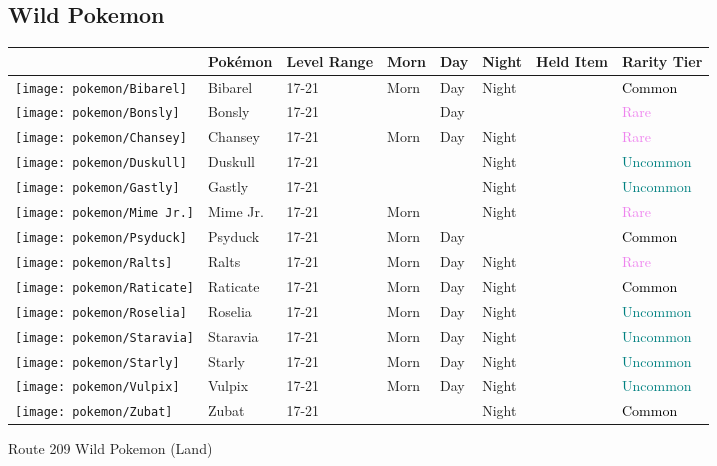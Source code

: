 \subsection{Wild Pokemon}%
\label{subsec:WildPokemon}%
\begin{longtable}{||l l l l l l l l||}%
\hline%
&Pokémon&Level Range&Morn&Day&Night&Held Item&Rarity Tier\\%
\hline%
\endhead%
\hline%
\texttt{[image: pokemon/Bibarel]}&Bibarel&17{-}21&Morn&Day&Night&&\textcolor{black}{%
Common%
}\\%
\hline%
\texttt{[image: pokemon/Bonsly]}&Bonsly&17{-}21&&Day&&&\textcolor{violet}{%
Rare%
}\\%
\hline%
\texttt{[image: pokemon/Chansey]}&Chansey&17{-}21&Morn&Day&Night&&\textcolor{violet}{%
Rare%
}\\%
\hline%
\texttt{[image: pokemon/Duskull]}&Duskull&17{-}21&&&Night&&\textcolor{teal}{%
Uncommon%
}\\%
\hline%
\texttt{[image: pokemon/Gastly]}&Gastly&17{-}21&&&Night&&\textcolor{teal}{%
Uncommon%
}\\%
\hline%
\texttt{[image: pokemon/Mime Jr.]}&Mime Jr.&17{-}21&Morn&&Night&&\textcolor{violet}{%
Rare%
}\\%
\hline%
\texttt{[image: pokemon/Psyduck]}&Psyduck&17{-}21&Morn&Day&&&\textcolor{black}{%
Common%
}\\%
\hline%
\texttt{[image: pokemon/Ralts]}&Ralts&17{-}21&Morn&Day&Night&&\textcolor{violet}{%
Rare%
}\\%
\hline%
\texttt{[image: pokemon/Raticate]}&Raticate&17{-}21&Morn&Day&Night&&\textcolor{black}{%
Common%
}\\%
\hline%
\texttt{[image: pokemon/Roselia]}&Roselia&17{-}21&Morn&Day&Night&&\textcolor{teal}{%
Uncommon%
}\\%
\hline%
\texttt{[image: pokemon/Staravia]}&Staravia&17{-}21&Morn&Day&Night&&\textcolor{teal}{%
Uncommon%
}\\%
\hline%
\texttt{[image: pokemon/Starly]}&Starly&17{-}21&Morn&Day&Night&&\textcolor{teal}{%
Uncommon%
}\\%
\hline%
\texttt{[image: pokemon/Vulpix]}&Vulpix&17{-}21&Morn&Day&Night&&\textcolor{teal}{%
Uncommon%
}\\%
\hline%
\texttt{[image: pokemon/Zubat]}&Zubat&17{-}21&&&Night&&\textcolor{black}{%
Common%
}\\%
\hline%
\end{longtable}%
\caption{Route 209 Wild Pokemon (Land)}